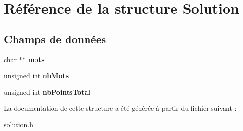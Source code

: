 \hypertarget{structSolution}{\section{Référence de la structure Solution}
\label{structSolution}
}
\subsection*{Champs de données}
\begin{DoxyCompactItemize}
\item 
\hypertarget{structSolution_ab511245410043c846351c6acf272d656}{char $\ast$$\ast$ {\bfseries mots}}\label{structSolution_ab511245410043c846351c6acf272d656}

\item 
\hypertarget{structSolution_a60e0881a49e593091d2210dd49f2f51a}{unsigned int {\bfseries nb\-Mots}}\label{structSolution_a60e0881a49e593091d2210dd49f2f51a}

\item 
\hypertarget{structSolution_a25fcaf3e9fa7e1a59a149f959f185826}{unsigned int {\bfseries nb\-Points\-Total}}\label{structSolution_a25fcaf3e9fa7e1a59a149f959f185826}

\end{DoxyCompactItemize}


La documentation de cette structure a été générée à partir du fichier suivant \-:\begin{DoxyCompactItemize}
\item 
solution.\-h\end{DoxyCompactItemize}
